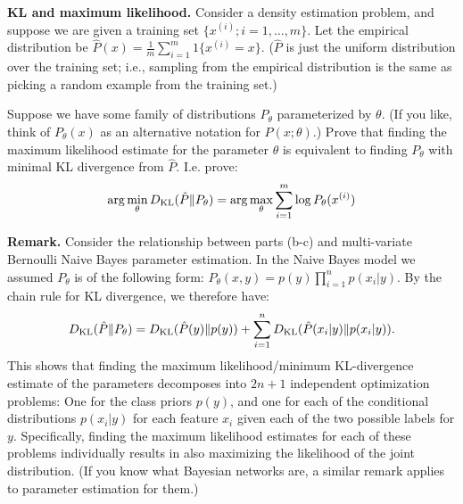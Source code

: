 \ifnum{} {
  \clearpage
} \fi
\item{}
\textbf{KL and maximum likelihood.}
    Consider a density estimation problem, and suppose we are given a
    training set $\{x^{(i)}; i=1,\ldots, m\}$.  Let the empirical
    distribution be $\hat{P}(x) = \frac{1}{m}\sum_{i=1}^{m}
    1\{x^{(i)}=x\}$. ($\hat{P}$ is just the uniform distribution over
    the training set; i.e., sampling from the empirical distribution is
    the same as picking a random example from the training set.)

    \iffalse
    Suppose we have some family of distributions $P(X; \theta)$
    parameterized by $\theta$.
    Prove that finding the maximum likelihood estimate for the parameter
    $\theta$ is equivalent to finding $P(X;\theta)$ with minimal KL
    divergence from $\hat{P}$. I.e. prove:
    \[
    \arg \min_{\theta} \KL(\hat{P}(X)\|P(X;\theta)) = \arg \max_{\theta}
    \sum_{i=1}^m \log P((x^{(i)}; \theta))
    \]
    \fi

    Suppose we have some family of distributions $P_\theta$
    parameterized by $\theta$.  (If you like, think of $P_\theta(x)$ as
    an alternative notation for $P(x;\theta)$.)  Prove that finding the
    maximum likelihood estimate for the parameter $\theta$ is equivalent
    to finding $P_{\theta}$ with minimal KL divergence from $\hat{P}$.
    I.e. prove:
    \[
    \arg \min_{\theta} D_{\text{KL}}(\hat{P}\|P_{\theta}) = \arg \max_{\theta}
    \sum_{i=1}^m \log P_{\theta}(x^{(i)})
    \]

    {\bf Remark.} Consider the relationship between parts (b-c) and
    multi-variate Bernoulli Naive Bayes parameter estimation. In the
    Naive Bayes model we assumed $P_{\theta}$ is of the following form:
    $P_{\theta}(x,y) = p(y)\prod_{i=1}^n p(x_i|y)$.  By the chain rule
    for KL divergence, we therefore have:
    $$ D_{\text{KL}}(\hat{P}\|P_{\theta}) = D_{\text{KL}}(\hat{P}(y)\|p(y)) + \sum_{i=1}^n
    D_{\text{KL}}(\hat{P}(x_i|y)\|p(x_i|y)).$$ This shows that finding the maximum
    likelihood/minimum KL-divergence estimate of the parameters
    decomposes into $2n+1$ independent optimization problems: One for
    the class priors $p(y)$, and one for each of the conditional
    distributions $p(x_i|y)$ for each feature $x_i$ given each of the
    two possible labels for $y$.  Specifically, finding the maximum
    likelihood estimates for each of these problems individually results
    in also maximizing the likelihood of the joint distribution.  (If
    you know what Bayesian networks are, a similar remark applies to
    parameter estimation for them.)

\ifnum{} {
  
} \fi
